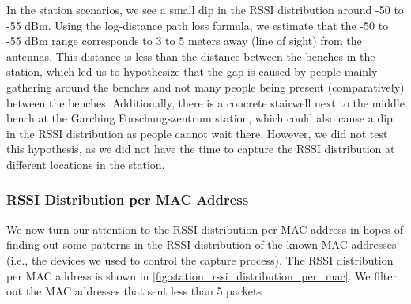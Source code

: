 \documentclass[sigconf,nonacm]{acmart}
\begin{document}
In the station scenarios, we see a small dip in the RSSI distribution around -50 to -55 dBm. Using the log-distance path loss formula, we estimate that the -50 to -55 dBm range corresponds to 3 to 5 meters away (line of sight) from the antennas. This distance is less than the distance between the benches in the station, which led us to hypothesize that the gap is caused by people mainly gathering around the benches and not many people being present (comparatively) between the benches. Additionally, there is a concrete stairwell next to the middle bench at the Garching Forschungszentrum station, which could also cause a dip in the RSSI distribution as people cannot wait there. However, we did not test this hypothesis, as we did not have the time to capture the RSSI distribution at different locations in the station.

\subsubsection{RSSI Distribution per MAC Address}
\label{sec:part-1/station/rssi-distribution-per-mac}

We now turn our attention to the RSSI distribution per MAC address in hopes of finding out some patterns in the RSSI distribution of the known MAC addresses (i.e., the devices we used to control the capture process). The RSSI distribution per MAC address is shown in \cref{fig:station_rssi_distribution_per_mac}. We filter out the MAC addresses that sent less than 5 packets
\end{document}
